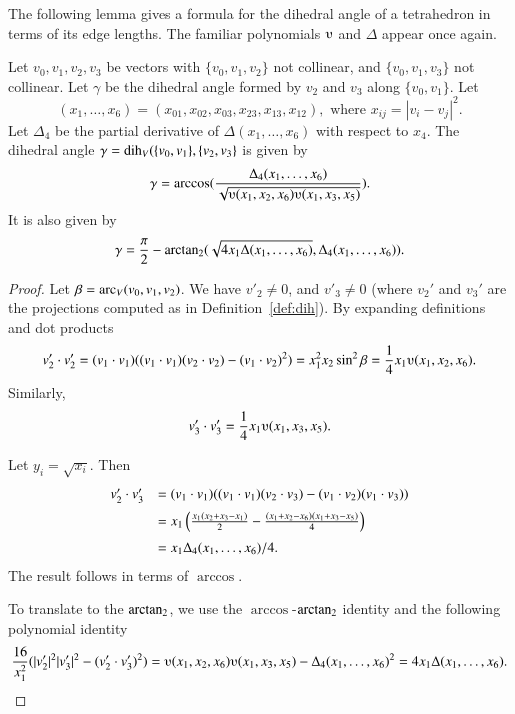 The following lemma gives a formula for the dihedral angle
of a tetrahedron in terms of its edge lengths.  The
familiar polynomials $\ups$ and $\Delta$ appear once again.


\begin{lemma} \label{lemma:dihform} Let $v_0,v_1,v_2,v_3$ 
be vectors with $\{v_0,v_1,v_2\}$ not collinear, 
and $\{v_0,v_1,v_3\}$ not
collinear. 
Let $\gamma$ be the dihedral angle formed
by $v_2$ and $v_3$ along $\{v_0,v_1\}$. Let
    $$(x_1,\ldots,x_6) = 
    (x_{01},x_{02},x_{03},x_{23},x_{13},x_{12}),
    \text{ where } x_{ij}=|v_i-v_j|^2.$$
Let $\Delta_4$ be the partial derivative of $\Delta(x_1,\ldots,x_6)$ with
respect to $x_4$.
The dihedral angle $\gamma=\operatorname{dih}_V(\{v_0,v_1\},\{v_2,v_3\}$
is given by
    $$
    \gamma=\arccos(\frac{\Delta_4(x_1,\ldots,x_6)}{\sqrt{
    \ups(x_1,x_2,x_6)\ups(x_1,x_3,x_5)}}).
    $$
It is also given by
    $$
    \gamma=\frac{\pi}{2} - {\operatorname{arctan_2}}
     ({\sqrt{4 x_1 \Delta(x_1,\ldots,x_6)}},{\Delta_4(x_1,\ldots,x_6)}).
    $$
\end{lemma}

\begin{proof}
Let $\beta = \operatorname{arc}_V(v_0,v_1,v_2)$.
We have $v'_2\ne 0$, and $v'_3 \ne 0$ (where $v_2'$ and
$v_3'$ are the projections computed as in Definition~\ref{def:dih}).  
    By expanding definitions and dot products
    $$
    v'_2\cdot v'_2 = (v_1\cdot v_1) ((v_1\cdot v_1)(v_2\cdot v_2) -
    (v_1\cdot v_2)^2) =  x_1^2 x_2 \sin^2 \beta = \frac{1}{4}
    x_1
    \ups(x_1,x_2,x_6).
    $$
    Similarly,
    $$v'_3 \cdot v'_3 = \frac{1}{4} x_1 \ups(x_1,x_3,x_5).$$

Let $y_i = \sqrt{x_i}$. Then
    $$\begin{array}{lll}
    v'_2\cdot v'_3 &= (v_1\cdot v_1)((v_1\cdot v_1)(v_2\cdot v_3) -
    (v_1\cdot v_2)(v_1\cdot v_3) ) \vspace{6pt} \\  &
    = x_1 \left(\frac{ x_1 (x_2 + x_3 -
    x_1)}{2} - \frac{(x_1 + x_2 - x_6)(x_1 + x_3 -
    x_5)}{4} \right)\vspace{6pt}\\&
    = {x_1\Delta_4(x_1,\ldots,x_6)}/{4}.
    \end{array}
    $$
The result follows in terms of $\arccos$.

To translate to the ${\operatorname{arctan_2}}$, 
we use the $\arccos$-${\operatorname{arctan_2}}$ identity
and the following polynomial identity
    $$
    \frac{16}{x_1^2}(|v'_2|^2 |v'_3|^2 - (v'_2\cdot v'_3)^2) =
    \ups(x_1,x_2,x_6)\ups(x_1,x_3,x_5) - \Delta_4(x_1,\ldots,x_6)^2
    = 4 x_1 \Delta(x_1,\ldots,x_6).
    $$
\end{proof}



